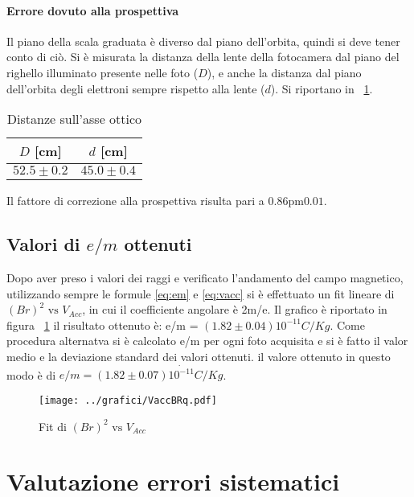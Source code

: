 \documentclass[10pt,a4paper]{article}
\begin{document}
\paragraph{Errore dovuto alla prospettiva} Il piano della scala graduata è diverso dal piano dell'orbita, quindi si deve tener conto di ciò. Si è misurata la distanza della lente della fotocamera dal piano del righello illuminato presente nelle foto ($D$), e anche la distanza dal piano dell'orbita degli elettroni sempre rispetto alla lente ($d$).
Si riportano in \tablename{~\ref{tab:dist}}.
\begin{table}[H]
	\centering
	\begin{tabular}{c|c}
		$D$ [cm] & $d$ [cm]\\
		\hline
		$52.5 \pm 0.2$ & $45.0 \pm 0.4$\\
	\end{tabular}
	\caption{Distanze sull'asse ottico}
	\label{tab:dist}
\end{table}

Il fattore di correzione alla prospettiva risulta pari a $\unit{0.86 \pm 0.01}{}$.

\subsection{Valori di $e/m$ ottenuti}
Dopo aver preso i valori dei raggi e  verificato l'andamento del campo magnetico, utilizzando sempre le formule \eqref{eq:em} e \eqref{eq:vacc} si è effettuato un fit lineare di $(Br)^{2} \text{ vs } V_{Acc}$, in cui il coefficiente angolare è 2m/e. Il grafico è riportato in figura \figurename{~\ref{fig:VaccBRq}} il risultato ottenuto è: e/m = $(1.82\pm0.04){10^{-11}} C/Kg$. Come procedura alternatva si è calcolato e/m per ogni foto acquisita e si è fatto il valor medio e la deviazione standard dei valori ottenuti.  il valore ottenuto in questo modo è di $e/m = (1.82\pm0.07)\dot{10^{-11}} C/Kg$.

\begin{figure}[H]
	\centering
	\texttt{[image: ../grafici/VaccBRq.pdf]}
	\caption{Fit di $(Br)^2 \text{ vs } V_{Acc}$}
	\label{fig:VaccBRq}
\end{figure}



\section{Valutazione errori sistematici}
\end{document}
